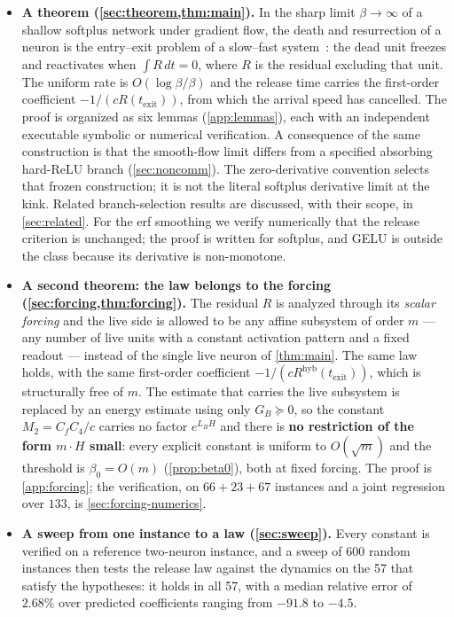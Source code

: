\documentclass[11pt]{article}
\theoremstyle{definition}
\theoremstyle{remark}
\newcommand{\texit}{t_{\mathrm{exit}}}
\newcommand{\hyb}{\mathrm{hyb}}
\begin{document}
\begin{itemize}
\item \textbf{A theorem (\cref{sec:theorem,thm:main}).} In the sharp limit
$\beta\to\infty$ of a shallow softplus network under gradient flow, the death and
resurrection of a neuron is the entry--exit problem of a slow--fast
system~\cite{DMS16}: the dead unit freezes and reactivates when $\int R\,dt=0$,
where $R$ is the residual excluding that unit. The uniform rate is
$O(\log\beta/\beta)$ and the release time carries the first-order coefficient
$-1/(cR(\texit))$, from which the arrival speed has cancelled. The proof is
organized as six lemmas (\cref{app:lemmas}), each with an independent executable
symbolic or numerical verification. A consequence of the same construction is
that the smooth-flow limit differs from a specified absorbing hard-ReLU
branch (\cref{sec:noncomm}). The zero-derivative convention selects that
frozen construction; it is not the literal softplus derivative limit at the
kink. Related branch-selection results are discussed, with their scope, in
\cref{sec:related}. For the erf smoothing we verify
numerically that the release criterion is unchanged; the proof is written for
softplus, and GELU is outside the class because its derivative is non-monotone.

\item \textbf{A second theorem: the law belongs to the forcing
(\cref{sec:forcing,thm:forcing}).} The residual $R$ is analyzed through its
\emph{scalar forcing} and the live side is allowed to be any affine
subsystem of order $m$ --- any number of live units with a constant activation
pattern and a fixed readout --- instead of the single live neuron of
\cref{thm:main}. The same law holds, with the same first-order coefficient
$-1/(cR^{\hyb}(\texit))$, which is structurally free of $m$. The estimate that
carries the live subsystem is replaced by an energy estimate using only
$G_B\succeq0$, so the constant $M_2=C_fC_4/c$ carries no factor $e^{L_BH}$ and
there is \textbf{no restriction of the form $m\cdot H$ small}: every explicit
constant is uniform to $O(\sqrt m)$ and the threshold is $\beta_0=O(m)$
(\cref{prop:beta0}), both at fixed forcing. The proof is
\cref{app:forcing}; the verification, on $66+23+67$ instances and a joint
regression over $133$, is \cref{sec:forcing-numerics}.

\item \textbf{A sweep from one instance to a law (\cref{sec:sweep}).} Every
constant is verified on a reference two-neuron instance, and a sweep of 600
random instances then tests the release law against the dynamics on the 57 that
satisfy the hypotheses: it holds in all 57, with a median relative error of
$2.68\%$ over predicted coefficients ranging from $-91.8$ to $-4.5$.


\end{itemize}
\end{document}
